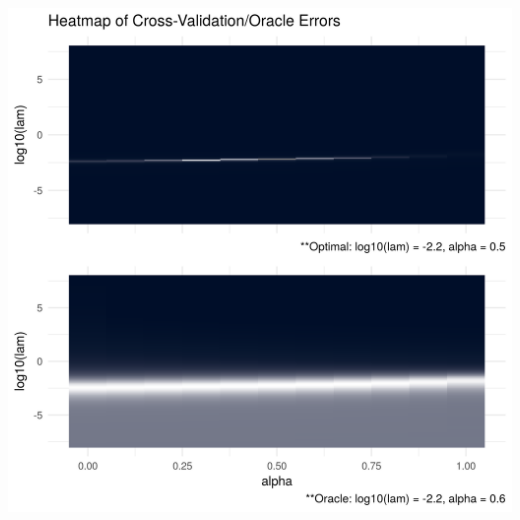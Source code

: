 \documentclass[12pt,]{book}
\theoremstyle{definition}
\theoremstyle{definition}
\theoremstyle{definition}
\theoremstyle{remark}
\begin{document}
\includegraphics{images/repsKLdense_N50_P10.png}

\vspace{0.5cm}
\end{document}
